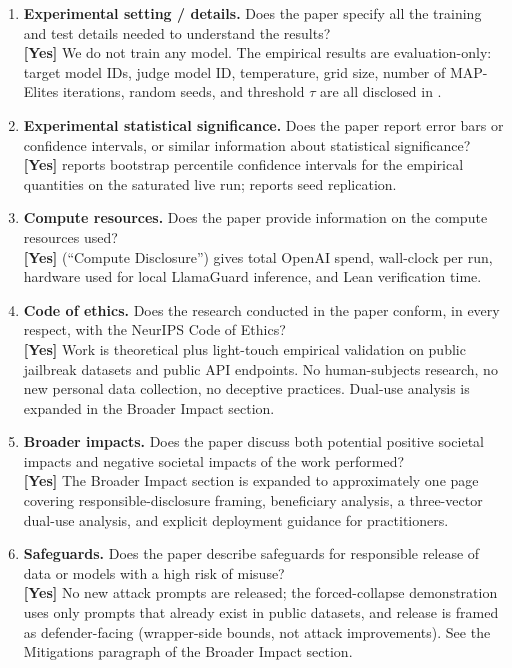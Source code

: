 \begin{enumerate}[leftmargin=1.9em,itemsep=0.25em]
\item \textbf{Experimental setting / details.} Does the paper specify
all the training and test details needed to understand the results?
\\\textbf{[Yes]} We do not train any model. The empirical results
are evaluation-only: target model IDs, judge model ID, temperature,
grid size, number of MAP-Elites iterations, random seeds, and
threshold $\tau$ are all disclosed in
.

\item \textbf{Experimental statistical significance.} Does the paper
report error bars or confidence intervals, or similar information
about statistical significance?
\\\textbf{[Yes]}  reports bootstrap percentile
confidence intervals for the empirical quantities on the saturated
live run;  reports seed replication.

\item \textbf{Compute resources.} Does the paper provide information
on the compute resources used?
\\\textbf{[Yes]}  (``Compute Disclosure'') gives
total OpenAI spend, wall-clock per run, hardware used for local
LlamaGuard inference, and Lean verification time.

\item \textbf{Code of ethics.} Does the research conducted in the
paper conform, in every respect, with the NeurIPS Code of Ethics?
\\\textbf{[Yes]} Work is theoretical plus light-touch empirical
validation on public jailbreak datasets and public API endpoints.
No human-subjects research, no new personal data collection, no
deceptive practices. Dual-use analysis is expanded in the
Broader Impact section.

\item \textbf{Broader impacts.} Does the paper discuss both potential
positive societal impacts and negative societal impacts of the work
performed?
\\\textbf{[Yes]} The Broader Impact section is expanded to
approximately one page covering responsible-disclosure framing,
beneficiary analysis, a three-vector dual-use analysis, and
explicit deployment guidance for practitioners.

\item \textbf{Safeguards.} Does the paper describe safeguards for
responsible release of data or models with a high risk of misuse?
\\\textbf{[Yes]} No new attack prompts are released; the
forced-collapse demonstration uses only prompts that already exist
in public datasets, and release is framed as defender-facing
(wrapper-side bounds, not attack improvements). See the
Mitigations paragraph of the Broader Impact section.


\end{enumerate}
